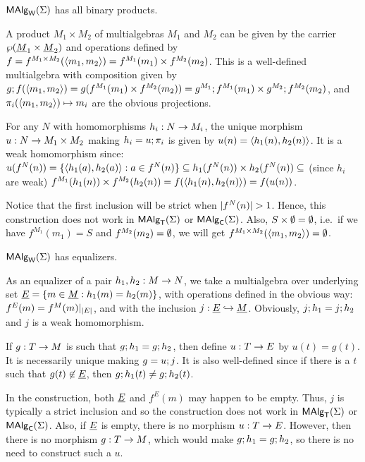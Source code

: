 \documentclass[10pt]{article}
\begin{document}
\begin{Lemma}
$\mbox{\rm\sf MAlg}_{\sf W}(\Sigma)$ has all binary products.
\end{Lemma}

\begin{Proof}
A product $M_1\times M_2$ of multialgebras $M_1$ and $M_2$ can be
given by the carrier $\wp{(\underline {M}_1\times \underline {M}_2)}$ and
operations defined by $f=f^{M_1\times M_2}(\langle m_1,m_2\rangle) =
f^{M_1}(m_1)\times f^{M_2}(m_2)$.  This is a well-defined multialgebra
with composition given by $g;f(\langle m_1,m_2\rangle) =
g(f^{M_1}(m_1)\times f^{M_2}(m_2)) =
g^{M_1};f^{M_1}(m_1)\times g^{M_2};f^{M_2}(m_2)$, and
$\pi_i(\langle m_1,m_2\rangle)\mapsto m_i$ are the obvious projections.

For any $N$ with homomorphisms $h_i:N\rightarrow M_i$, the unique morphism
$u:N\rightarrow M_1\times M_2$ making $h_i=u;\pi_i$ is given by
$u(n)=\langle h_1(n),h_2(n)\rangle$. It is a weak homomorphism since:
$u(f^N(n)) = \{\langle h_1(a),h_2(a)\rangle:a\in f^N(n)\} \subseteq
h_1(f^N(n))\times h_2(f^N(n)) \subseteq$ (since $h_i$ are weak)
$f^{M_1}(h_1(n))\times f^{M_2}(h_2(n)) = f(\langle h_1(n),h_2(n)\rangle) =
f(u(n))$.
\end{Proof}

\noindent
Notice that the first inclusion will be strict when
$\Card{f^N(n)}>1$. Hence, this construction does not work in $\mbox{\rm\sf MAlg}_{\sf T}(\Sigma)$
or $\mbox{\rm\sf MAlg}_{\sf C}(\Sigma)$. Also, $S\times\emptyset=\emptyset$, i.e.\ if we have
$f^{M_{1}}(m_1)=S$ and $f^{M_{2}}(m_2)=\emptyset$, we will get
$f^{M_{1}\times M_{2}}(\langle m_1,m_2\rangle)=\emptyset$.

\begin{Lemma}
$\mbox{\rm\sf MAlg}_{\sf W}(\Sigma)$ has equalizers.
\end{Lemma}

\begin{Proof}
As an equalizer of a pair $h_1,h_2:M\rightarrow N$, we take a multialgebra
over underlying set $\underline {E} = \{m\in\underline {M}:h_1(m)=h_2(m)\}$, with
operations defined in the obvious way: $f^E(m)=f^M(m)|_{|E|}$, and
with the inclusion $j:\underline {E} \hookrightarrow \underline {M}$.  Obviously, $j;h_1=j;h_2$ and $j$ is a weak homomorphism.

If $g:T\rightarrow M$ is such that $g;h_1=g;h_2$, then define
$u:T\rightarrow E$ by $u(t)=g(t)$. It is necessarily unique making $g=u;j$. It is also well-defined since if there is a $t$ such that
$g(t)\not\in \underline {E}$, then $g;h_1(t)\not=g;h_2(t)$.
\end{Proof}

\noindent
In the construction, both $\underline {E}$ and $f^E(m)$ may happen to be
empty. Thus, $j$ is typically a strict inclusion and so the
construction does not work in $\mbox{\rm\sf MAlg}_{\sf T}(\Sigma)$ or $\mbox{\rm\sf MAlg}_{\sf C}(\Sigma)$. Also, if $\underline {E}$
is empty, there is no morphism $u:T\rightarrow E$. However, then there is no
morphism $g:T\rightarrow M$, which would make $g;h_1=g;h_2$,
so there is no need to construct such a $u$.
\end{document}
